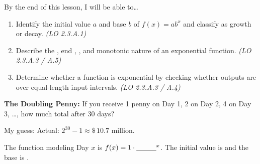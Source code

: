 \documentclass[10pt]{article}
\begin{document}
\namedateperiod

\vspace{0.06in}

\begin{objectivebox}
By the end of this lesson, I will be able to\ldots
\begin{enumerate}[itemsep=2pt]
  \item Identify the initial value $a$ and base $b$ of $f(x) = ab^x$ and classify as
        \blank{3cm} growth or \blank{3cm} decay. \hfill\textit{(LO 2.3.A.1)}
  \item Describe the \blank{2.5cm}, end \blank{2.5cm}, \blank{3cm}, and monotonic
        nature of an exponential function. \hfill\textit{(LO 2.3.A.3 / A.5)}
  \item Determine whether a function is exponential by checking whether outputs are
        \blank{4cm} over equal-length input intervals. \hfill\textit{(LO 2.3.A.3 / A.4)}
\end{enumerate}
\end{objectivebox}

\vspace{0.04in}

\begin{vocabbox}
\end{vocabbox}

\vspace{0.04in}

\begin{hookbox}
\textbf{The Doubling Penny:} If you receive 1 penny on Day 1, 2 on Day 2, 4 on Day 3, \ldots,
how much total after 30 days?

\medskip
My guess: \blank{4cm} \quad Actual: $2^{30} - 1 \approx \$\,10.7$ million.

\medskip
The function modeling Day $x$ is $f(x) = 1 \cdot \blank{1cm}^x$.
The initial value is \blank{1.5cm} and the base is \blank{1.5cm}.
\end{hookbox}

\vspace{0.04in}
\end{document}
